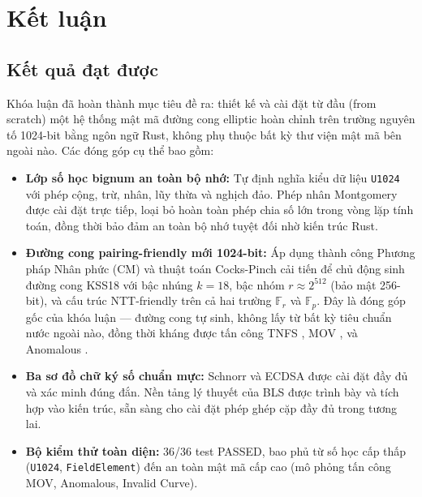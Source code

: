 
\clearpage
{}

\setcounter{chapter}{5}
\chapter[Kết luận]{Kết luận}

\section{Kết quả đạt
được}\label{kux1ebft-quux1ea3-ux111ux1ea1t-ux111ux1b0ux1ee3c}

Khóa luận đã hoàn thành mục tiêu đề ra: thiết kế và cài đặt từ đầu (from
scratch) một hệ thống mật mã đường cong elliptic hoàn chỉnh trên trường
nguyên tố 1024-bit bằng ngôn ngữ Rust, không phụ thuộc bất kỳ thư viện
mật mã bên ngoài nào. Các đóng góp cụ thể bao gồm:

\begin{itemize}
\item
  \textbf{Lớp số học bignum an toàn bộ nhớ:} Tự định nghĩa kiểu dữ liệu
  \texttt{U1024} với phép cộng, trừ, nhân, lũy thừa và nghịch đảo. Phép
  nhân Montgomery \citep{Montgomery1985} được cài đặt trực tiếp, loại bỏ
  hoàn toàn phép chia số lớn trong vòng lặp tính toán, đồng thời bảo đảm
  an toàn bộ nhớ tuyệt đối nhờ kiến trúc Rust.
\item
  \textbf{Đường cong pairing-friendly mới 1024-bit:} Áp dụng thành công
  Phương pháp Nhân phức (CM) và thuật toán Cocks-Pinch cải tiến
  \citep{CocksPinch2001} để chủ động sinh đường cong KSS18 với bậc nhúng
  \(k = 18\), bậc nhóm \(r \approx 2^{512}\) (bảo mật 256-bit), và cấu
  trúc NTT-friendly trên cả hai trường \(\mathbb{F}_r\) và
  \(\mathbb{F}_p\). Đây là đóng góp gốc của khóa luận --- đường cong tự
  sinh, không lấy từ bất kỳ tiêu chuẩn nước ngoài nào, đồng thời kháng
  được tấn công TNFS \citep{BarbulescuDuquesne2019}, MOV
  \citep{MOV1993}, và Anomalous \citep{SmartAnomaly1999}.
\item
  \textbf{Ba sơ đồ chữ ký số chuẩn mực:} Schnorr \citep{Schnorr1989} và
  ECDSA \citep{FIPS186_4} được cài đặt đầy đủ và xác minh đúng đắn. Nền
  tảng lý thuyết của BLS \citep{BLS2001} được trình bày và tích hợp vào
  kiến trúc, sẵn sàng cho cài đặt phép ghép cặp đầy đủ trong tương lai.
\item
  \textbf{Bộ kiểm thử toàn diện:} 36/36 test PASSED, bao phủ từ số học
  cấp thấp (\texttt{U1024}, \texttt{FieldElement}) đến an toàn mật mã
  cấp cao (mô phỏng tấn công MOV, Anomalous, Invalid Curve).
\end{itemize}

